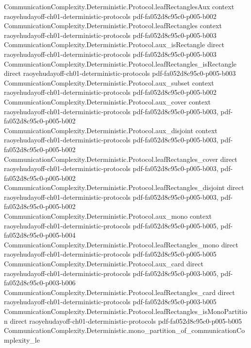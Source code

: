 \begin{theorem}
\proofstep
  {CommunicationComplexity.Deterministic.Protocol.leafRectanglesAux}
  {context}
  {raoyehudayoff-ch01-deterministic-protocols}
  {pdf-fa052d8c95c0-p005-b002}
\proofstep
  {CommunicationComplexity.Deterministic.Protocol.leafRectangles}
  {context}
  {raoyehudayoff-ch01-deterministic-protocols}
  {pdf-fa052d8c95c0-p005-b003}
\proofstep
  {CommunicationComplexity.Deterministic.Protocol.aux_isRectangle}
  {direct}
  {raoyehudayoff-ch01-deterministic-protocols}
  {pdf-fa052d8c95c0-p005-b003}
\proofstep
  {CommunicationComplexity.Deterministic.Protocol.leafRectangles_isRectangle}
  {direct}
  {raoyehudayoff-ch01-deterministic-protocols}
  {pdf-fa052d8c95c0-p005-b003}
\proofstep
  {CommunicationComplexity.Deterministic.Protocol.aux_subset}
  {context}
  {raoyehudayoff-ch01-deterministic-protocols}
  {pdf-fa052d8c95c0-p005-b002}
\proofstep
  {CommunicationComplexity.Deterministic.Protocol.aux_cover}
  {context}
  {raoyehudayoff-ch01-deterministic-protocols}
  {pdf-fa052d8c95c0-p005-b003,
    pdf-fa052d8c95c0-p005-b002}
\proofstep
  {CommunicationComplexity.Deterministic.Protocol.aux_disjoint}
  {context}
  {raoyehudayoff-ch01-deterministic-protocols}
  {pdf-fa052d8c95c0-p005-b003,
    pdf-fa052d8c95c0-p005-b002}
\proofstep
  {CommunicationComplexity.Deterministic.Protocol.leafRectangles_cover}
  {direct}
  {raoyehudayoff-ch01-deterministic-protocols}
  {pdf-fa052d8c95c0-p005-b003,
    pdf-fa052d8c95c0-p005-b002}
\proofstep
  {CommunicationComplexity.Deterministic.Protocol.leafRectangles_disjoint}
  {direct}
  {raoyehudayoff-ch01-deterministic-protocols}
  {pdf-fa052d8c95c0-p005-b003,
    pdf-fa052d8c95c0-p005-b002}
\proofstep
  {CommunicationComplexity.Deterministic.Protocol.aux_mono}
  {context}
  {raoyehudayoff-ch01-deterministic-protocols}
  {pdf-fa052d8c95c0-p005-b005,
    pdf-fa052d8c95c0-p005-b004}
\proofstep
  {CommunicationComplexity.Deterministic.Protocol.leafRectangles_mono}
  {direct}
  {raoyehudayoff-ch01-deterministic-protocols}
  {pdf-fa052d8c95c0-p005-b005}
\proofstep
  {CommunicationComplexity.Deterministic.Protocol.aux_card}
  {direct}
  {raoyehudayoff-ch01-deterministic-protocols}
  {pdf-fa052d8c95c0-p003-b005,
    pdf-fa052d8c95c0-p003-b006}
\proofstep
  {CommunicationComplexity.Deterministic.Protocol.leafRectangles_card}
  {direct}
  {raoyehudayoff-ch01-deterministic-protocols}
  {pdf-fa052d8c95c0-p003-b005}
\proofstep
  {CommunicationComplexity.Deterministic.Protocol.leafRectangles_isMonoPartition}
  {direct}
  {raoyehudayoff-ch01-deterministic-protocols}
  {pdf-fa052d8c95c0-p005-b005}
\proofstep
  {CommunicationComplexity.Deterministic.mono_partition_of_communicationComplexity_le}

\end{theorem}
